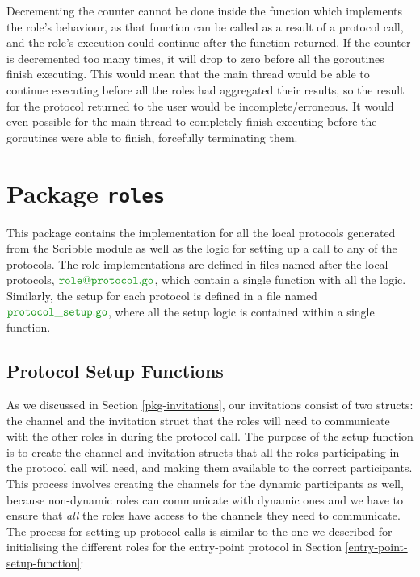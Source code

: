 \documentclass[12pt,twoside]{report}
\begin{document}
Decrementing the counter cannot be done inside the function which implements the role's behaviour, as that function can be called as a result of a protocol call, and the role's execution could continue after the function returned. If the counter is decremented too many times, it will drop to zero before all the goroutines finish executing. This would mean that the main thread would be able to continue executing before all the roles had aggregated their results, so the result for the protocol returned to the user would be incomplete/erroneous. It would even possible for the main thread to completely finish executing before the goroutines were able to finish, forcefully terminating them. 


\section{Package \texttt{roles}}\label{pkg-roles}
This package contains the implementation for all the local protocols generated from the Scribble module as well as the logic for setting up a call to any of the protocols. The role implementations are defined in files named after the local protocols, $\filename{role@protocol}$, which contain a single function with all the logic. Similarly, the setup for each protocol is defined in a file named $\filename{protocol\_setup}$, where all the setup logic is contained within a single function.

\subsection{Protocol Setup Functions}\label{protocol-setup-functions}
As we discussed in Section \ref{pkg-invitations}, our invitations consist of two structs: the channel and the invitation struct that the roles will need to communicate with the other roles in during the protocol call. The purpose of the setup function is to create the channel and invitation structs that all the roles participating in the protocol call will need, and making them available to the correct participants. This process involves creating the channels for the dynamic participants as well, because non-dynamic roles can communicate with dynamic ones and we have to ensure that \textit{all} the roles have access to the channels they need to communicate. The process for setting up protocol calls is similar to the one we described for initialising the different roles for the entry-point protocol in Section \ref{entry-point-setup-function}:
\end{document}
